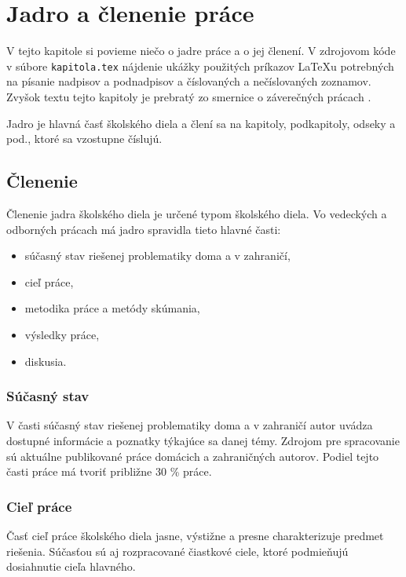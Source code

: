 \chapter{Jadro a členenie práce}

\label{kap:clenenie} %

V tejto kapitole si povieme niečo o jadre práce a o jej členení. V zdrojovom kóde v súbore
\verb'kapitola.tex' nájdenie ukážky použitých príkazov LaTeXu potrebných na písanie nadpisov a
podnadpisov a číslovaných a nečíslovaných zoznamov. Zvyšok textu tejto kapitoly je prebratý zo
smernice o záverečných prácach \cite[článok 5]{smernica}.

Jadro je hlavná časť školského diela a člení sa na kapitoly, podkapitoly, odseky a pod., ktoré sa
vzostupne číslujú.

\section{Členenie}
Členenie jadra školského diela je určené typom  školského diela. Vo vedeckých a odborných prácach má
jadro spravidla tieto hlavné časti:
\begin{itemize}
  \item  súčasný stav riešenej problematiky doma a v zahraničí,
  \item  cieľ práce,
  \item  metodika práce a metódy skúmania,
  \item  výsledky práce,
  \item  diskusia.
\end{itemize}

\subsection{Súčasný stav}
V časti súčasný stav riešenej problematiky doma a v zahraničí autor uvádza dostupné informácie a
poznatky týkajúce sa danej témy. Zdrojom pre spracovanie sú aktuálne publikované práce domácich a
zahraničných autorov.  Podiel tejto časti práce má tvoriť približne 30 \% práce.

\subsection{Cieľ práce}
Časť cieľ práce  školského diela jasne, výstižne a presne charakterizuje predmet riešenia. Súčasťou
sú aj rozpracované čiastkové ciele, ktoré podmieňujú dosiahnutie cieľa hlavného.

